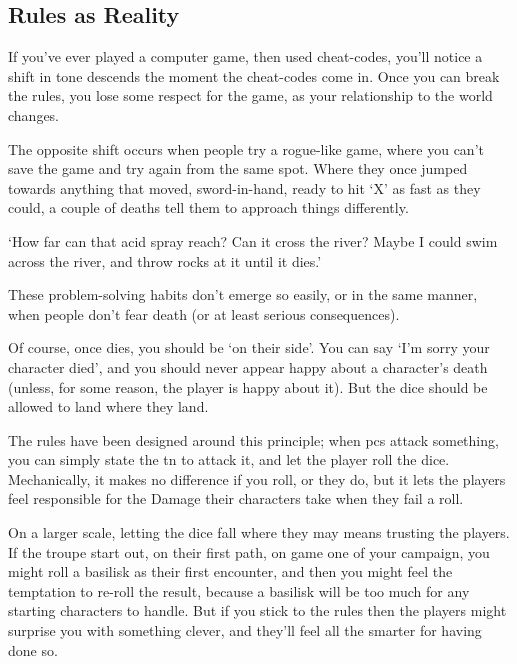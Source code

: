 \begin{multicols}{2}

\subsection{Rules as Reality}

If you've ever played a computer game, then used cheat-codes, you'll notice a shift in tone descends the moment the cheat-codes come in.
Once you can break the rules, you lose some respect for the game, as your relationship to the world changes.

The opposite shift occurs when people try a rogue-like game, where you can't save the game and try again from the same spot.
Where they once jumped towards anything that moved, sword-in-hand, ready to hit `X' as fast as they could, a couple of deaths tell them to approach things differently.

\begin{speechtext}
  `How far can that acid spray reach?
  Can it cross the river?
  Maybe I could swim across the river, and throw rocks at it until it dies.'
\end{speechtext}

These problem-solving habits don't emerge so easily, or in the same manner, when people don't fear death (or at least serious consequences).

Of course, once  dies, you should be `on their side'.
You can say `I'm sorry your character died', and you should never appear happy about a character's death (unless, for some reason, the player is happy about it).
But the dice should be allowed to land where they land.

The rules have been designed around this principle; when \glspl{pc} attack something, you can simply state the \gls{tn} to attack it, and let the player roll the dice.
Mechanically, it makes no difference if you roll, or they do, but it lets the players feel responsible for the Damage their characters take when they fail a roll.

On a larger scale, letting the dice fall where they may means trusting the players.
If the troupe start out, on their first path, on game one of your \gls{campaign}, you might roll a basilisk as their first encounter, and then you might feel the temptation to re-roll the result, because a basilisk will be too much for any starting characters to handle.
But if you stick to the rules then the players might surprise you with something clever, and they'll feel all the smarter for having done so.


\end{multicols}
